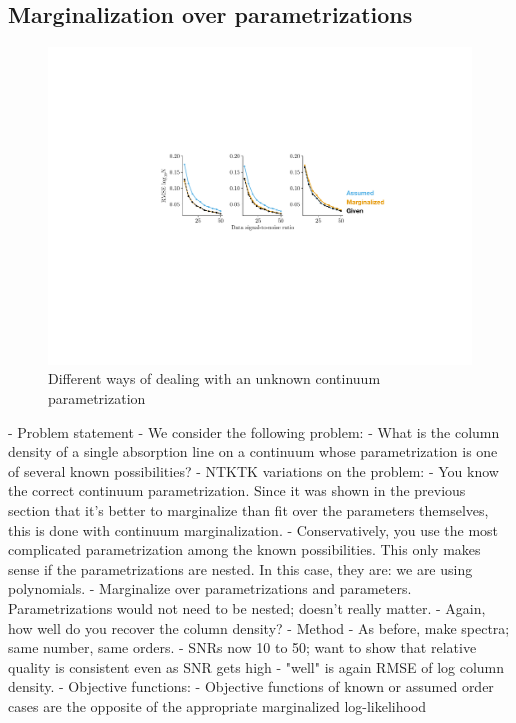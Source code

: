 \documentclass[manuscript]{aastex62}
\begin{document}
\subsection{Marginalization over parametrizations}
\begin{figure}
  \includegraphics[width=\linewidth]{figures/order_strategies_labeled.pdf}
  \caption{Different ways of dealing with an unknown continuum parametrization}
  \label{fig:order-unknown-comparison}
\end{figure}
- Problem statement
  - We consider the following problem:
    - What is the column density of a single absorption line on a continuum whose parametrization is one of several known possibilities?
    - NTKTK variations on the problem:
      - You know the correct continuum parametrization. Since it was shown in the previous section that it's better to marginalize than fit over the parameters themselves, this is done with continuum marginalization.
      - Conservatively, you use the most complicated parametrization among the known possibilities. This only makes sense if the parametrizations are nested. In this case, they are: we are using polynomials.
      - Marginalize over parametrizations and parameters. Parametrizations would not need to be nested; doesn't really matter.
    - Again, how well do you recover the column density?
- Method
  - As before, make spectra; same number, same orders.
  - SNRs now 10 to 50; want to show that relative quality is consistent even as SNR gets high
  - "well" is again RMSE of log column density.
  - Objective functions:
    - Objective functions of known or assumed order cases are the opposite of the appropriate marginalized log-likelihood
\end{document}
